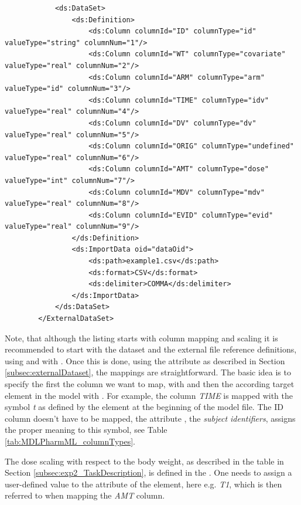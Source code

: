 \begin{lstlisting}
            <ds:DataSet>
                <ds:Definition>
                    <ds:Column columnId="ID" columnType="id" valueType="string" columnNum="1"/>
                    <ds:Column columnId="WT" columnType="covariate" valueType="real" columnNum="2"/>
                    <ds:Column columnId="ARM" columnType="arm" valueType="id" columnNum="3"/>
                    <ds:Column columnId="TIME" columnType="idv" valueType="real" columnNum="4"/>
                    <ds:Column columnId="DV" columnType="dv" valueType="real" columnNum="5"/>
                    <ds:Column columnId="ORIG" columnType="undefined" valueType="real" columnNum="6"/>
                    <ds:Column columnId="AMT" columnType="dose" valueType="int" columnNum="7"/>
                    <ds:Column columnId="MDV" columnType="mdv" valueType="real" columnNum="8"/>
                    <ds:Column columnId="EVID" columnType="evid" valueType="real" columnNum="9"/>
                </ds:Definition>
                <ds:ImportData oid="dataOid">
                    <ds:path>example1.csv</ds:path>
                    <ds:format>CSV</ds:format>
                    <ds:delimiter>COMMA</ds:delimiter>
                </ds:ImportData>
            </ds:DataSet>
        </ExternalDataSet>
\end{lstlisting}
Note, that although the listing starts with column mapping and scaling it is 
recommended to start with the dataset 
and the external file reference definitions, using  and 
 with . Once this is done, using the attribute
 as described in Section \ref{subsec:externalDataset}, 
the mappings are straightforward.
The basic idea is to specify the first the column we want to map, with 
and then the according target element in the model with . For example,
the column \emph{TIME} is mapped with the symbol \emph{t} as defined by the 
 element at the beginning of the model file.
The ID column doesn't have to be mapped, 
the attribute , the \emph{subject identifiers}, assigns the 
proper meaning to this symbol, see Table \ref{tab:MDLPharmML_columnTypes}. 

The dose scaling with respect to the body weight, as described in the table in Section \ref{subsec:exp2_TaskDescription}, 
is defined in the .
One needs to assign a user-defined value to the attribute  of the element, 
here e.g. \emph{T1}, which is then referred to when mapping the \emph{AMT} column.

